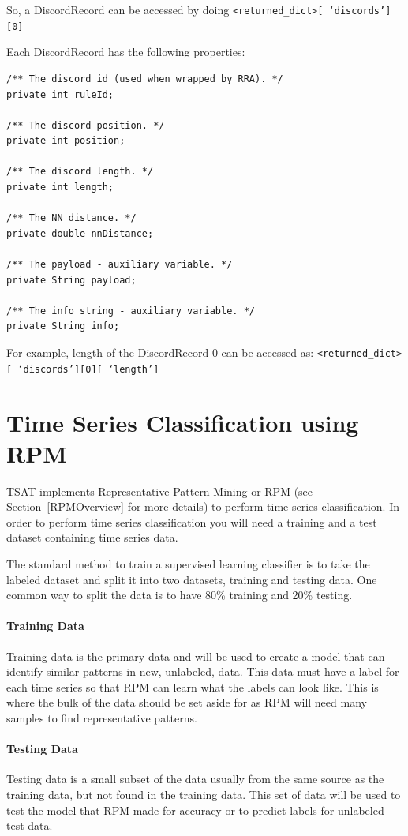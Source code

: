 \documentclass[letterpaper, 12pt]{article}
\def\bsq#1{%
	\lq{#1}\rq}
\begin{document}
So, a DiscordRecord can be accessed by doing 
\texttt{<returned\_dict>[\bsq{discords}][0]}

Each DiscordRecord has the following properties:
\begin{lstlisting}
/** The discord id (used when wrapped by RRA). */
private int ruleId;

/** The discord position. */
private int position;

/** The discord length. */
private int length;

/** The NN distance. */
private double nnDistance;

/** The payload - auxiliary variable. */
private String payload;

/** The info string - auxiliary variable. */
private String info;

\end{lstlisting}

For example, length of the DiscordRecord 0 can be accessed as:
\texttt{<returned\_dict>[\bsq{discords}][0][\bsq{length}]}


\section{Time Series Classification using RPM}
\label{ClassGuide}
TSAT implements Representative Pattern Mining or RPM  (see Section~\ref{RPMOverview} for more details) to perform time series classification.  In order to perform time series classification you will need a training and a test dataset containing time series data.

The standard method to train a supervised learning classifier is to take the labeled dataset and split it into two datasets, training and testing data.  One common way to split the data is to have 80\% training and 20\% testing.  

\paragraph{Training Data}
Training data is the primary data and will be used to create a model that can identify similar patterns in new, unlabeled, data. This data must have a label for each time series so that RPM can learn what the labels can look like. This is where the bulk of the data should be set aside for as RPM will need many samples to find representative patterns.

\paragraph{Testing Data}
Testing data is a small subset of the data usually from the same source as the training data, but not found in the training data. This set of data will be used to test the model that RPM made for accuracy or to predict labels for unlabeled test data.
\end{document}
